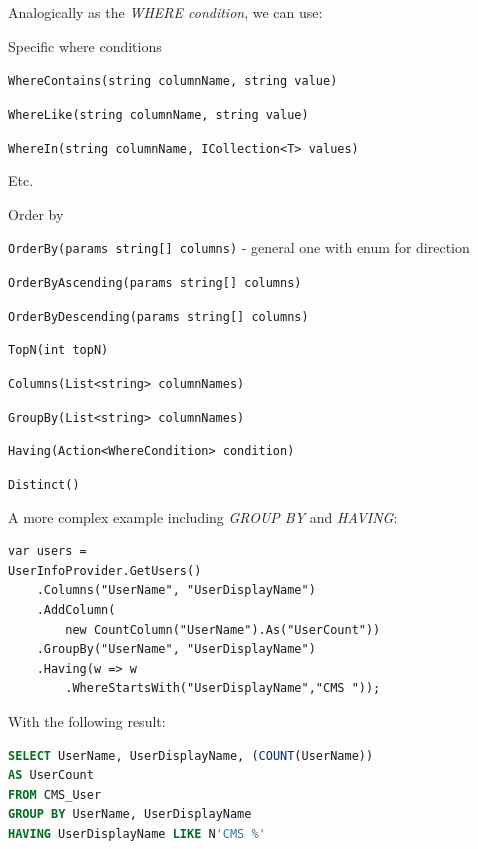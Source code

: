 \documentclass[
  print,
  table,
  nolof,
  nolot,
  nocover,
  oneside
]{fithesis3}
\begin{document}
Analogically as the \textit{WHERE condition}, we can use:
\begin{compactenum}
  \item Specific where conditions
  \begin{compactenum}
    \item \texttt{WhereContains(string columnName, string value)}
    \item \texttt{WhereLike(string columnName, string value)}
    \item \texttt{WhereIn(string columnName, ICollection<T> values)}
    \item Etc.
  \end{compactenum}

  \item Order by
  \begin{compactenum}
    \item \texttt{OrderBy(params string[] columns)} - general one with enum for direction
    \item \texttt{OrderByAscending(params string[] columns)}
    \item \texttt{OrderByDescending(params string[] columns)}
  \end{compactenum}
    
  \item \texttt{TopN(int topN)}
  \item \texttt{Columns(List<string> columnNames)}
  \item \texttt{GroupBy(List<string> columnNames)}
  \item \texttt{Having(Action<WhereCondition> condition)}
  \item \texttt{Distinct()}
\end{compactenum}

A more complex example including \textit{GROUP BY} and \textit{HAVING}:
\begin{lstlisting}
var users =
UserInfoProvider.GetUsers()
    .Columns("UserName", "UserDisplayName")
    .AddColumn(
        new CountColumn("UserName").As("UserCount"))
    .GroupBy("UserName", "UserDisplayName")
    .Having(w => w
        .WhereStartsWith("UserDisplayName","CMS "));
\end{lstlisting}
With the following result:
\begin{lstlisting}[language=SQL,escapechar=@,language=SQL,basicstyle=\ttfamily]
SELECT UserName, UserDisplayName, (COUNT(UserName))
AS UserCount
FROM CMS_User
GROUP BY UserName, UserDisplayName
HAVING UserDisplayName LIKE N'CMS %'
\end{lstlisting}
\end{document}
